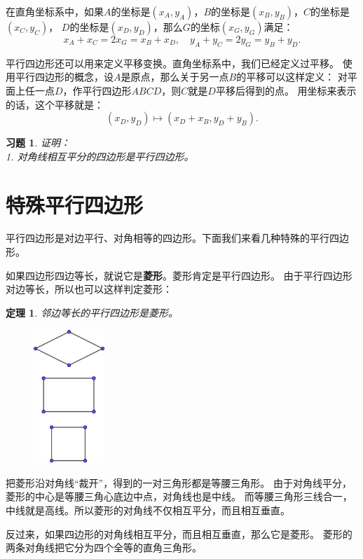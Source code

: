 \documentclass[12pt,UTF8]{ctexbook}
\newtheorem{tm}{定理}[section]
\newtheorem{xt}{习题}[section]
\begin{document}
在直角坐标系中，如果$A$的坐标是$(x_A, y_A)$，$B$的坐标是$(x_B, y_B)$，$C$的坐标是$(x_C, y_C)$，
$D$的坐标是$(x_D, y_D)$，那么$G$的坐标$(x_G, y_G)$满足：
$$ x_A + x_C = 2 x_G = x_B + x_D, \quad y_A + y_C = 2 y_G = y_B + y_D. $$

平行四边形还可以用来定义平移变换。直角坐标系中，我们已经定义过平移。
使用平行四边形的概念，设$A$是原点，那么关于另一点$B$的平移可以这样定义：
对平面上任一点$D$，作平行四边形$ABCD$，则$C$就是$D$平移后得到的点。
用坐标来表示的话，这个平移就是：
$$ (x_D, y_D) \mapsto (x_D + x_B, y_D + y_B).$$

\begin{xt}\label{xt:0-0-0}
    证明：\\
    1. 对角线相互平分的四边形是平行四边形。
\end{xt}

\section{特殊平行四边形}
平行四边形是对边平行、对角相等的四边形。下面我们来看几种特殊的平行四边形。

如果四边形四边等长，就说它是\textbf{菱形}。菱形肯定是平行四边形。
由于平行四边形对边等长，所以也可以这样判定菱形：
\begin{tm}\label{tm:0-1-0}
    邻边等长的平行四边形是菱形。
\end{tm}

\begin{figure} %
    \centering
    \includegraphics[width=0.24\textwidth]{tu/特殊平行四边形.png}
\end{figure}

把菱形沿对角线“裁开”，得到的一对三角形都是等腰三角形。
由于对角线平分，菱形的中心是等腰三角心底边中点，对角线也是中线。
而等腰三角形三线合一，中线就是高线。所以菱形的对角线不仅相互平分，而且相互垂直。

反过来，如果四边形的对角线相互平分，而且相互垂直，那么它是菱形。
菱形的两条对角线把它分为四个全等的直角三角形。
\end{document}
